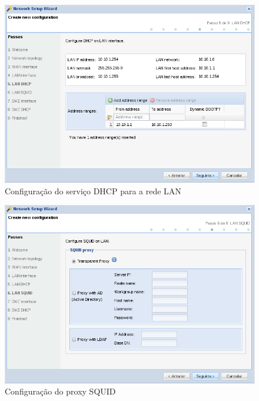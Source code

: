 \begin{figure}[H]
    \begin{center}
    \includegraphics[scale=0.38]{screenshots/etfw/etfw_wizard_05.png}
    \caption{Configuração do serviço DHCP para a rede LAN}
    \label{fig:etfw_wizard_passo5}
    \end{center}
\end{figure}

\begin{figure}[H]
    \begin{center}
    \includegraphics[scale=0.38]{screenshots/etfw/etfw_wizard_06.png}
    \caption{Configuração do proxy SQUID}
    \label{fig:etfw_wizard_passo6}
    \end{center}
\end{figure}

